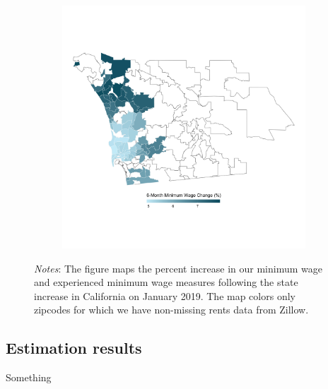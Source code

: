 \begin{figure}
\begin{subfigure}[b]{0.55\textwidth}
		\includegraphics[width = \textwidth]
			{../../analysis/descriptive/output/San_Diego_expmw_msa.png}
	\end{subfigure}
	\begin{minipage}{0.95\textwidth} \footnotesize
		\vspace{2mm} 
		\textit{Notes}: The figure maps the percent increase in our minimum wage and 
		experienced minimum wage measures following the state increase in California
		on January 2019. The map colors only zipcodes for which we have non-missing 
		rents data from Zillow.
	\end{minipage}
\end{figure}



\subsection{Estimation results}

Something

